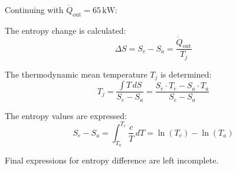 Continuing with \( \dot{Q}_{\text{out}} = 65 \, \text{kW} \):  

The entropy change is calculated:  
\[
\Delta S = S_e - S_a = \frac{\dot{Q}_{\text{out}}}{T_j}
\]  

The thermodynamic mean temperature \( T_j \) is determined:  
\[
T_j = \frac{\int T \, dS}{S_e - S_a} = \frac{S_e \cdot T_e - S_a \cdot T_a}{S_e - S_a}
\]  

The entropy values are expressed:  
\[
S_e - S_a = \int_{T_a}^{T_e} \frac{c}{T} \, dT = \ln(T_e) - \ln(T_a)
\]  

Final expressions for entropy difference are left incomplete.